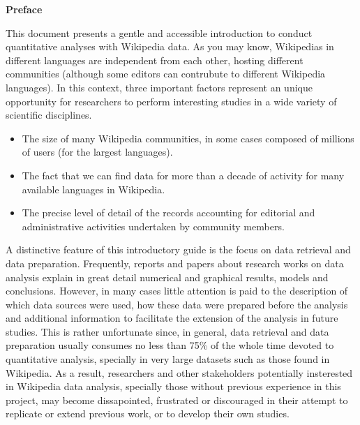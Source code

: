 
\centerline{\Large \textbf{Preface}}

\vspace{0.4in}

\linespread{1.6}

This document presents a gentle and accessible introduction to conduct quantitative
analyses with Wikipedia data. As you may know, Wikipedias in different languages are
independent from each other, hosting different communities (although some editors can
contrubute to different Wikipedia languages). In this context, three important
factors represent an unique opportunity for researchers to perform interesting 
studies in a wide variety of scientific disciplines.

\begin{itemize}
 \item The size of many Wikipedia communities, in some cases composed of millions 
of users (for the largest languages).
 \item The fact that we can find data for more than a decade of activity for many
available languages in Wikipedia.
 \item The precise level of detail of the records accounting for editorial and
administrative activities undertaken by community members.
\end{itemize}

A distinctive feature of this introductory guide is the focus on data retrieval 
and data preparation. Frequently, reports and papers about research works on data 
analysis explain in great detail numerical 
and graphical results, models and conclusions. However, in many cases little 
attention is paid to the description of which data sources were used, 
how these data were prepared before the analysis and additional 
information to facilitate the extension of the analysis in future studies. This is rather
unfortunate since, in general, data retrieval and data preparation usually consumes
no less than 75\% of the whole time devoted to quantitative analysis, specially
in very large datasets such as those found in Wikipedia. As a result, researchers 
and other stakeholders potentially insterested in Wikipedia data analysis, 
specially those without previous experience in this project, may become dissapointed, 
frustrated or discouraged in their attempt to replicate or extend previous work, 
or to develop their own studies. 

